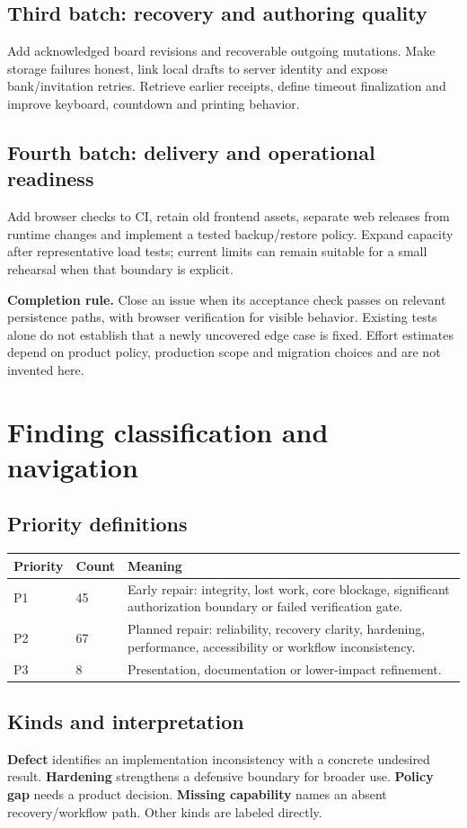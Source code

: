 \documentclass[11pt,a4paper]{article}
\begin{document}
\subsection{Third batch: recovery and authoring quality}
Add acknowledged board revisions and recoverable outgoing mutations. Make storage failures honest, link local drafts to server identity and expose bank/invitation retries. Retrieve earlier receipts, define timeout finalization and improve keyboard, countdown and printing behavior.
\subsection{Fourth batch: delivery and operational readiness}
Add browser checks to CI, retain old frontend assets, separate web releases from runtime changes and implement a tested backup/restore policy. Expand capacity after representative load tests; current limits can remain suitable for a small rehearsal when that boundary is explicit.

\textbf{Completion rule.} Close an issue when its acceptance check passes on relevant persistence paths, with browser verification for visible behavior. Existing tests alone do not establish that a newly uncovered edge case is fixed. Effort estimates depend on product policy, production scope and migration choices and are not invented here.
\clearpage

\section{Finding classification and navigation}

\subsection{Priority definitions}
\begin{tabularx}{\textwidth}{@{}P{16mm}P{16mm}X@{}}\toprule Priority & Count & Meaning \\\midrule
P1 & 45 & Early repair: integrity, lost work, core blockage, significant authorization boundary or failed verification gate. \\
P2 & 67 & Planned repair: reliability, recovery clarity, hardening, performance, accessibility or workflow inconsistency. \\
P3 & 8 & Presentation, documentation or lower-impact refinement. \\\bottomrule\end{tabularx}
\subsection{Kinds and interpretation}
\textbf{Defect} identifies an implementation inconsistency with a concrete undesired result. \textbf{Hardening} strengthens a defensive boundary for broader use. \textbf{Policy gap} needs a product decision. \textbf{Missing capability} names an absent recovery/workflow path. Other kinds are labeled directly.
\end{document}
